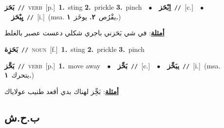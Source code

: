 \documentclass[10pt,a4paper,twoside]{article} %
\begin{document}
\begin{multicols}{2}
{\setlength\topsep{0pt}\textbf{\foreignlanguage{arabic}{بَحَز}}\ {\color{gray}\texttt{//}\color{black}}\ \textsc{verb}\ [p.]\ \textbf{1.}~sting  \textbf{2.}~prickle  \textbf{3.}~pinch\ \ $\bullet$\ \ \setlength\topsep{0pt}\textbf{\foreignlanguage{arabic}{اِبْحَز}}\ {\color{gray}\texttt{//}\color{black}}\ [c.]\ \ $\bullet$\ \ \setlength\topsep{0pt}\textbf{\foreignlanguage{arabic}{يِبْحَز}}\ {\color{gray}\texttt{//}\color{black}}\ [i.]\ \color{gray}(msa. \foreignlanguage{arabic}{يقْرُص}~\foreignlanguage{arabic}{\textbf{٢.}}  \foreignlanguage{arabic}{يوخَز}~\foreignlanguage{arabic}{\textbf{١.}})\color{black}\  \begin{flushright}\color{gray}\foreignlanguage{arabic}{\textbf{\underline{\foreignlanguage{arabic}{أمثلة}}}: في شي بَحَزني باجري شكلي دعست عصبر بالغلط}\end{flushright}\color{black}} \vspace{2mm}

{\setlength\topsep{0pt}\textbf{\foreignlanguage{arabic}{بَحَزِة}}\ {\color{gray}\texttt{//}\color{black}}\ \textsc{noun}\ [f.]\ \textbf{1.}~sting  \textbf{2.}~prickle  \textbf{3.}~pinch\ } \vspace{2mm}

{\setlength\topsep{0pt}\textbf{\foreignlanguage{arabic}{بَحَّز}}\ {\color{gray}\texttt{//}\color{black}}\ \textsc{verb}\ [p.]\ \textbf{1.}~move away\ \ $\bullet$\ \ \setlength\topsep{0pt}\textbf{\foreignlanguage{arabic}{بَحِّز}}\ {\color{gray}\texttt{//}\color{black}}\ [c.]\ \ $\bullet$\ \ \setlength\topsep{0pt}\textbf{\foreignlanguage{arabic}{يبَحِّز}}\ {\color{gray}\texttt{//}\color{black}}\ [i.]\ \color{gray}(msa. \foreignlanguage{arabic}{يتحرك}~\foreignlanguage{arabic}{\textbf{١.}})\color{black}\  \begin{flushright}\color{gray}\foreignlanguage{arabic}{\textbf{\underline{\foreignlanguage{arabic}{أمثلة}}}: بَحِِّز لهناك بدي أقعد طنيب عولاياك}\end{flushright}\color{black}} \vspace{2mm}

\vspace{-3mm}
\subsection*{\color{blue}\foreignlanguage{arabic}{ب.ح.ش}\color{blue}{}} 


\end{multicols}
\end{document}
